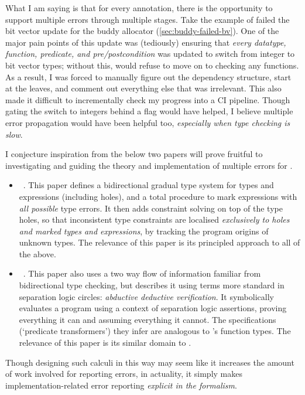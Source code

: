 What I am saying is that for every  annotation, there is the opportunity
to support multiple errors through multiple stages. Take the example of failed
the bit vector update for the buddy allocator (\cref{sec:buddy-failed-bv}). One
of the major pain points of this update was (tediously) ensuring that
\emph{every datatype, function, predicate, and pre/postcondition} was updated
to switch from integer to bit vector types; without this,  would refuse
to move on to checking any functions. As a result, I was forced to manually
figure out the dependency structure, start at the leaves, and comment out
everything else that was irrelevant. This also made it difficult to
incrementally check my progress into a CI pipeline. Though gating the switch to
integers behind a flag would have helped, I believe multiple error propagation
would have been helpful too, \emph{especially when type checking is slow}.

I conjecture inspiration from the below two papers will prove fruitful
to investigating and guiding the theory and implementation of multiple
errors for .
\begin{itemize}
    \item {}~.
        This paper defines a bidirectional gradual
        type system for types and expressions (including holes), and a total
        procedure to mark expressions with \emph{all possible} type errors. It
        then adds constraint solving on top of the type holes, so that
        inconsistent type constraints are localised \emph{exclusively to holes
        and marked types and expressions}, by tracking the program origins of
        unknown types. The relevance of this paper is its principled approach
        to all of the above.
    \item {}~.
        This paper also uses a two way flow of
        information familiar from bidirectional type checking, but describes it
        using terms more standard in separation logic circles: \emph{abductive
        deductive verification}. It symbolically evaluates a program using a
        context of separation logic assertions, proving everything it can and
        assuming everything it cannot. The specifications (`predicate
        transformers') they infer are analogous to 's function types.
        The relevance of this paper is its similar domain to .
\end{itemize}
Though designing such calculi in this way may seem like it increases the amount
of work involved for reporting errors, in actuality, it simply makes
implementation-related error reporting \emph{explicit in the formalism}.

